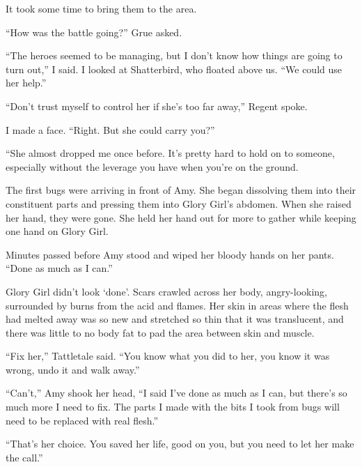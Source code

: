 It took some time to bring them to the area.



``How was the battle going?''  Grue asked.



``The heroes seemed to be managing, but I don't know how things are going to turn out,'' I said.  I looked at Shatterbird, who floated above us.  ``We could use her help.''



``Don't trust myself to control her if she's too far away,'' Regent spoke.



I made a face.  ``Right.  But she could carry you?''



``She almost dropped me once before.  It's pretty hard to hold on to someone, especially without the leverage you have when you're on the ground.



The first bugs were arriving in front of Amy.  She began dissolving them into their constituent parts and pressing them into Glory Girl's abdomen.  When she raised her hand, they were gone.  She held her hand out for more to gather while keeping one hand on Glory Girl.



Minutes passed before Amy stood and wiped her bloody hands on her pants.  ``Done as much as I can.''



Glory Girl didn't look `done'.  Scars crawled across her body, angry-looking, surrounded by burns from the acid and flames.  Her skin in areas where the flesh had melted away was so new and stretched so thin that it was translucent, and there was little to no body fat to pad the area between skin and muscle.



``Fix her,'' Tattletale said.  ``You know what you did to her, you know it was wrong, undo it and walk away.''



``Can't,'' Amy shook her head, ``I said I've done as much as I can, but there's so much more I need to fix.  The parts I made with the bits I took from bugs will need to be replaced with real flesh.''



``That's her choice.  You saved her life, good on you, but you need to let her make the call.''



